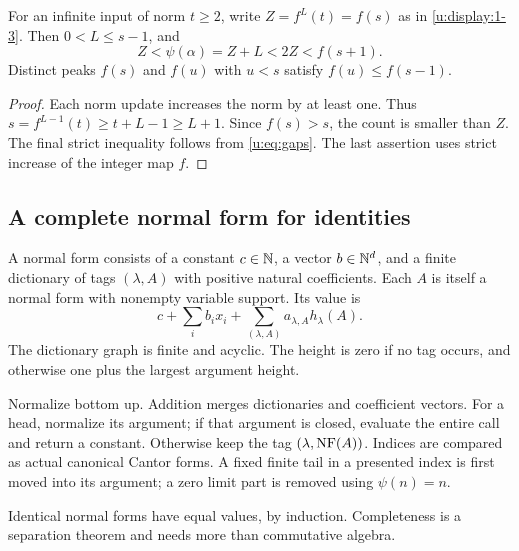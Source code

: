 \begin{lemma}\label{u:lem:sparse}
For an infinite input of norm $t\ge2$, write $Z=f^L(t)=f(s)$ as in \eqref{u:display:1-3}.
Then $0<L\le s-1$, and
\begin{equation}
           Z<\psi(\alpha)=Z+L<2Z<f(s+1).             \label{u:display:1-6}
\end{equation}
Distinct peaks $f(s)$ and $f(u)$ with $u<s$ satisfy $f(u)\le f(s-1)$.
\end{lemma}
\begin{proof}
Each norm update increases the norm by at least one. Thus
$s=f^{L-1}(t)\ge t+L-1\ge L+1$. Since $f(s)>s$, the count is smaller than
$Z$. The final strict inequality follows from \eqref{u:eq:gaps}. The last
assertion uses strict increase of the integer map $f$.
\end{proof}

\subsection{A complete normal form for identities}
\begin{definition}\label{u:def:nf}
A normal form consists of a constant $c\in\mathbb N$, a vector
$b\in\mathbb N^d$, and a finite dictionary of tags $(\lambda,A)$ with positive
natural coefficients. Each $A$ is itself a normal form with nonempty
variable support. Its value is
\begin{equation}
       c+\sum_i b_i x_i+\sum_{(\lambda,A)} a_{\lambda,A}h_\lambda(A).
                                                               \label{u:display:2-1}
\end{equation}
The dictionary graph is finite and acyclic. The height is zero if no tag
occurs, and otherwise one plus the largest argument height.
\end{definition}
Normalize bottom up. Addition merges dictionaries and coefficient vectors.
For a head, normalize its argument; if that argument is closed, evaluate
the entire call and return a constant. Otherwise keep the tag
$(\lambda,\operatorname{NF}(A))$. Indices are compared as actual canonical Cantor forms.
A fixed finite tail in a presented index is first moved into its argument;
a zero limit part is removed using $\psi(n)=n$.

Identical normal forms have equal values, by induction. Completeness is a
separation theorem and needs more than commutative algebra.

